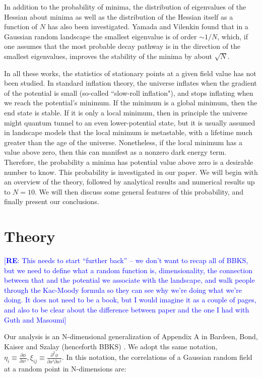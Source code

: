 \documentclass[12pt]{article}
\newcommand{\re}[1]{\textcolor{blue}{[{\bf RE}: #1]}}
\begin{document}
In addition to the probability of minima, the distribution of eigenvalues of the Hessian about minima as well as the distribution of the Hessian itself as a function of $N$ has also been investigated.\cite{Yamada2018} Yamada and Vilenkin found that in a Gaussian random landscape the smallest eigenvalue is of order $\sim 1/N$, which, if one assumes that the most probable decay pathway is in the direction of the smallest eigenvalues, improves the stability of the minima by about $\sqrt{N}$.

In all these works, the statistics of stationary points at a given field value has not been studied. In standard inflation theory, the universe inflates when the gradient of the potential is small (so-called ``slow-roll inflation"), and stops inflating when we reach the potential's minimum. If the minimum is a global minimum, then the end state is stable. If it is only a local minimum, then in principle the universe might quantum tunnel to an even lower-potential state, but it is usually assumed in landscape models that the local minimum is metastable, with a lifetime much greater than the age of the universe. Nonetheless, if the local minimum has a value above zero, then this can manifest as a nonzero dark energy term. Therefore, the probability a minima has potential value above zero is a desirable number to know. This probability is investigated in our paper. We will begin with an overview of the theory, followed by analytical results and numerical results up to $N=10$. We will then discuss some general features of this probability, and finally present our conclusions.

\section{Theory}

\re{This needs to start ``further back'' -- we don't want to recap all of BBKS, but we need to define what a random function is, dimensionality, the connection between that  and the potential we associate with the landscape, and walk people through the Kac-Moody formula so they can see why we're doing what we're doing. It does not need to be a book, but I would imagine it as a couple of pages, and also to be clear about the difference between paper and the one I had with Guth and Masoumi}

Our analysis is an N-dimensional generalization of Appendix A in Bardeen, Bond, Kaiser and Szalay (henceforth BBKS) \cite{BBKS}. We adopt ths same notation, $\eta_i \equiv \frac{\partial \phi}{\partial x^i}, \xi_{ij} \equiv \frac{\partial^2 \phi}{\partial x^i \partial x^j}$. In this notation, the correlations of a Gaussian random field at a random point in N-dimensions are:
\end{document}
